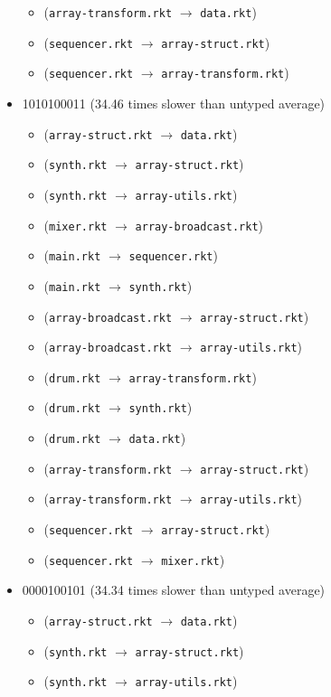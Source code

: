\documentclass{article}
\newcommand{\mono}[1]{\texttt{#1}}
\begin{document}
\begin{itemize}
\begin{itemize}
  \item (\mono{array-transform.rkt} $\rightarrow$ \mono{data.rkt})
  \item (\mono{sequencer.rkt} $\rightarrow$ \mono{array-struct.rkt})
  \item (\mono{sequencer.rkt} $\rightarrow$ \mono{array-transform.rkt})
  \end{itemize}
\item 1010100011 (34.46 times slower than untyped average)
  \begin{itemize}
  \item (\mono{array-struct.rkt} $\rightarrow$ \mono{data.rkt})
  \item (\mono{synth.rkt} $\rightarrow$ \mono{array-struct.rkt})
  \item (\mono{synth.rkt} $\rightarrow$ \mono{array-utils.rkt})
  \item (\mono{mixer.rkt} $\rightarrow$ \mono{array-broadcast.rkt})
  \item (\mono{main.rkt} $\rightarrow$ \mono{sequencer.rkt})
  \item (\mono{main.rkt} $\rightarrow$ \mono{synth.rkt})
  \item (\mono{array-broadcast.rkt} $\rightarrow$ \mono{array-struct.rkt})
  \item (\mono{array-broadcast.rkt} $\rightarrow$ \mono{array-utils.rkt})
  \item (\mono{drum.rkt} $\rightarrow$ \mono{array-transform.rkt})
  \item (\mono{drum.rkt} $\rightarrow$ \mono{synth.rkt})
  \item (\mono{drum.rkt} $\rightarrow$ \mono{data.rkt})
  \item (\mono{array-transform.rkt} $\rightarrow$ \mono{array-struct.rkt})
  \item (\mono{array-transform.rkt} $\rightarrow$ \mono{array-utils.rkt})
  \item (\mono{sequencer.rkt} $\rightarrow$ \mono{array-struct.rkt})
  \item (\mono{sequencer.rkt} $\rightarrow$ \mono{mixer.rkt})
  \end{itemize}
\item 0000100101 (34.34 times slower than untyped average)
  \begin{itemize}
  \item (\mono{array-struct.rkt} $\rightarrow$ \mono{data.rkt})
  \item (\mono{synth.rkt} $\rightarrow$ \mono{array-struct.rkt})
  \item (\mono{synth.rkt} $\rightarrow$ \mono{array-utils.rkt})

\end{itemize}
\end{itemize}
\end{document}
